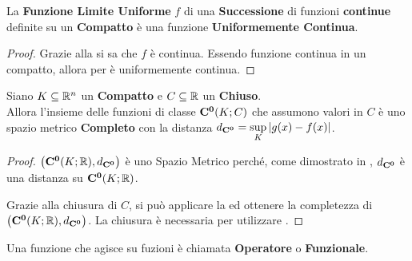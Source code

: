 \begin{corollary}
	La \textbf{Funzione Limite Uniforme} $f$ di una \textbf{Successione} di funzioni \textbf{continue} definite su un \textbf{Compatto} è una funzione \textbf{Uniformemente Continua}.
	\begin{proof}
		Grazie alla  si sa che $f$ è continua. Essendo funzione continua in un compatto, allora per  è uniformemente continua.
	\end{proof}
\end{corollary}
\begin{corollary}
	\label{prop:compl_dist_spm_compl}
	Siano $K \subseteq \mathbb{R}^n$ un \textbf{Compatto} e $C \subseteq \mathbb{R}$ un \textbf{Chiuso}.\\
	Allora l'insieme delle funzioni di classe $\mathbf{C^{0}}(K; C)$ che assumono valori in $C$ è uno spazio metrico \textbf{Completo} con la distanza $d_{\mathbf{C^{0}}} = \sup\limits_{K} \left|g(x) - f(x)\right|$.
	\begin{proof}
		$\bigl( \mathbf{C^{0}}(K; \mathbb{R}), d_{\mathbf{C^{0}}} \bigr)$ è uno Spazio Metrico perché, come dimostrato in \hyperref[ex:dim_dist_conv_unif]{}, $d_{\mathbf{C^{0}}}$ è una distanza su $\mathbf{C^{0}}(K; \mathbb{R})$.

		Grazie alla chiusura di $C$, si può applicare la  ed ottenere la completezza di $\bigl( \mathbf{C^{0}}(K; \mathbb{R}), d_{\mathbf{C^{0}}} \bigr)$. La chiusura è necessaria per utilizzare .
	\end{proof}
\end{corollary}

\begin{definition}[Operatore]
	Una funzione che agisce su fuzioni è chiamata \textbf{Operatore} o \textbf{Funzionale}.
\end{definition}

